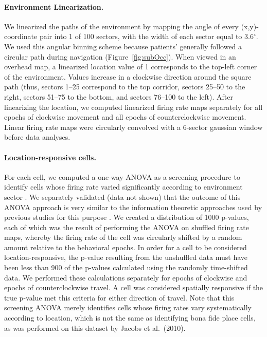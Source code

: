 \paragraph{Environment Linearization.} We linearized the paths of the environment by mapping the angle of every (x,y)-coordinate pair into 1 of 100 sectors, with the width of each sector equal to 3.6$^{\circ}$. We used this angular binning scheme because patients' generally followed a circular path during navigation (Figure~\ref{fig:subOcc}). When viewed in an overhead map, a linearized location value of 1 corresponds to the top-left corner of the environment. Values increase in a clockwise direction around the square path (thus, sectors 1--25 correspond to the top corridor, sectors 25--50 to the right, sectors 51--75 to the bottom, and sectors 76--100 to the left). After linearizing the location, we computed linearized firing rate maps separately for all epochs of clockwise movement and all epochs of counterclockwise movement. Linear firing rate maps were circularly convolved with a 6-sector gaussian window before data analyses.

\paragraph{Location-responsive cells.}
For each cell, we computed a one-way ANOVA as a screening procedure to identify cells whose firing rate varied significantly according to environment sector \cite{EkstEtal03}.  We separately validated (data not shown) that the outcome of this ANOVA  approach is very similar to the information theoretic approaches used by previous studies for this purpose  \cite{MarkEtal94}.  We created a distribution of 1000 p-values, each of which was the result of performing the ANOVA on shuffled firing rate maps, whereby the firing rate of the cell was circularly shifted by a random amount relative to the behavioral epochs. In order for a cell to be considered location-responsive, the p-value resulting from the unshuffled data must have been less than 900 of the p-values calculated using the randomly time-shifted data. We performed these calculations separately for epochs of clockwise and epochs of counterclockwise travel. A cell was considered spatially responsive if the true p-value met this criteria for either direction of travel.  Note that this screening ANOVA merely identifies cells whose firing rates vary systematically according to  location, which  is not the same as identifying bona fide place cells, as was performed on this dataset by Jacobs et al.\ (2010).

